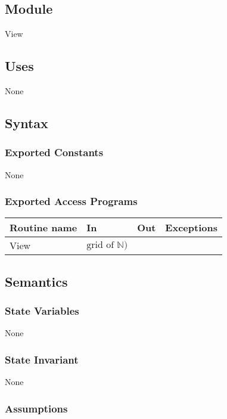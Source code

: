 \documentclass[12pt]{article}
\begin{document}
\subsection* {Module}

View

\subsection* {Uses}

None

\subsection* {Syntax}

\subsubsection* {Exported Constants}

None

\subsubsection* {Exported Access Programs}

\begin{tabular}{| l | l | l | l |}
\hline
\textbf{Routine name} & \textbf{In} & \textbf{Out} & \textbf{Exceptions}\\
\hline
View & $\text{grid of } \mathbb{N})$ & & \\
\hline

\end{tabular}

\subsection* {Semantics}

\subsubsection* {State Variables}

None

\subsubsection* {State Invariant}

None

\subsubsection* {Assumptions}
\end{document}
